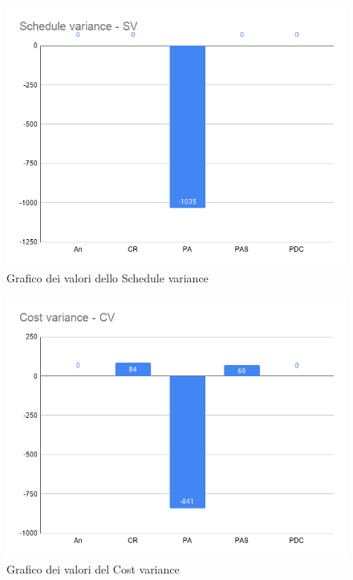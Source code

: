         \begin{figure}[H]
            \centering
            \includegraphics[width=11 cm]{source/sections/images/schedule_variance.png}
            \caption{Grafico dei valori dello Schedule variance}
        \end{figure}


        \begin{figure}[H]
            \centering
            \includegraphics[width=11 cm]{source/sections/images/cost_variance.png}
            \caption{Grafico dei valori del Cost variance}
        \end{figure}